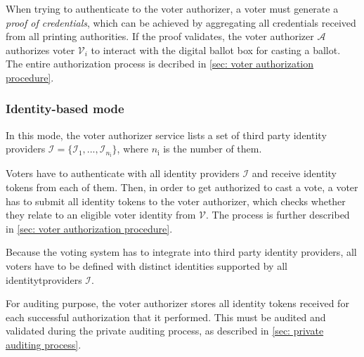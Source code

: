 When trying to authenticate to the voter authorizer, a voter must generate a \textit{proof of credentials}, which can be achieved by aggregating all credentials received from all printing authorities. If the proof validates, the voter authorizer $\mathcal{A}$ authorizes voter $\mathcal{V}_i$ to interact with the digital ballot box for casting a ballot. The entire authorization process is decribed in \cref{sec: voter authorization procedure}.


\subsubsection{Identity-based mode} \label{sec: identity-based mode}
In this mode, the voter authorizer service lists a set of third party identity providers $\boldsymbol{\mathcal{I}} = \{ \mathcal{I}_1, ..., \mathcal{I}_{n_\mathrm{i}} \}$, where $n_\mathrm{i}$ is the number of them.

Voters have to authenticate with all identity providers $\boldsymbol{\mathcal{I}}$ and receive identity tokens from each of them. Then, in order to get authorized to cast a vote, a voter has to submit all identity tokens to the voter authorizer, which checks whether they relate to an eligible voter identity from $\boldsymbol{\mathcal{V}}$. The process is further described in \cref{sec: voter authorization procedure}.

Because the voting system has to integrate into third party identity providers, all voters have to be defined with distinct identities supported by all identitytproviders $\boldsymbol{\mathcal{I}}$.

For auditing purpose, the voter authorizer stores all identity tokens received for each successful authorization that it performed. This must be audited and validated during the private auditing process, as described in \cref{sec: private auditing process}.
